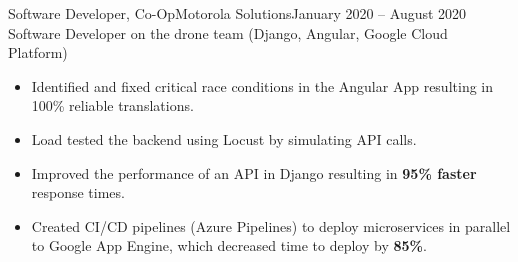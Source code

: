 \begin{cvsubsection}{Software Developer, Co-Op}{Motorola Solutions}{January 2020 -- August 2020}
	Software Developer on the drone team (Django, Angular, Google Cloud Platform)			
	\begin{itemize}
		\item Identified and fixed critical race conditions in the Angular App resulting in 100\% reliable translations.
		\item Load tested the backend using Locust by simulating API calls.
		\item Improved the performance of an API in Django resulting in \textbf{95\% faster} response times.
		\item Created CI/CD pipelines (Azure Pipelines) to deploy microservices in parallel to Google App Engine, which decreased time to deploy by \textbf{85\%}.
	\end{itemize}
\end{cvsubsection}